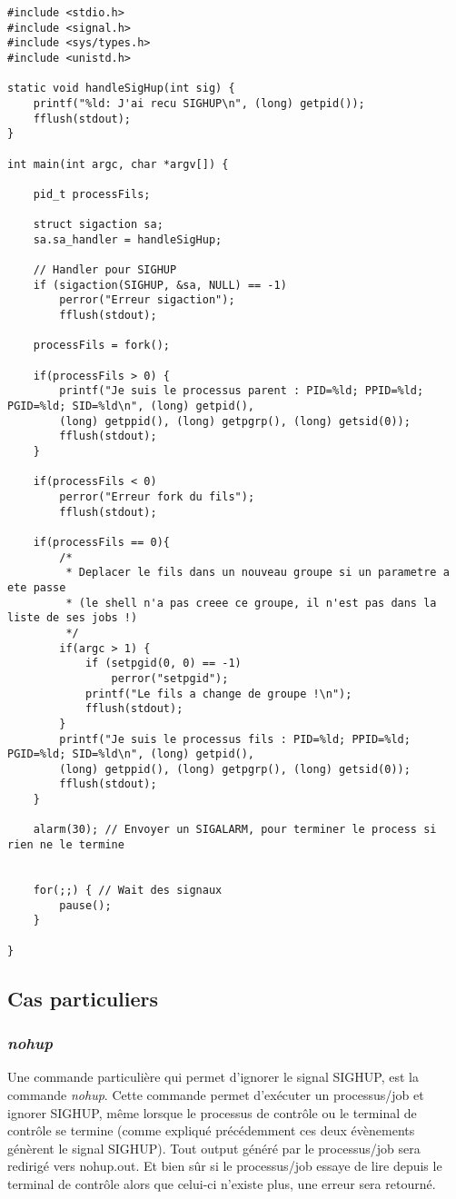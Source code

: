 \begin{lstlisting}[caption={sighup.c}, label={sighup.c}]
#include <stdio.h>
#include <signal.h>
#include <sys/types.h>
#include <unistd.h>

static void handleSigHup(int sig) {
    printf("%ld: J'ai recu SIGHUP\n", (long) getpid());
    fflush(stdout);
}

int main(int argc, char *argv[]) {

    pid_t processFils;

    struct sigaction sa;
    sa.sa_handler = handleSigHup;

    // Handler pour SIGHUP
    if (sigaction(SIGHUP, &sa, NULL) == -1)
        perror("Erreur sigaction");
        fflush(stdout);

    processFils = fork();

    if(processFils > 0) {
        printf("Je suis le processus parent : PID=%ld; PPID=%ld; PGID=%ld; SID=%ld\n", (long) getpid(),
        (long) getppid(), (long) getpgrp(), (long) getsid(0));
        fflush(stdout);
    }

    if(processFils < 0)
        perror("Erreur fork du fils");
        fflush(stdout);

    if(processFils == 0){
        /*
         * Deplacer le fils dans un nouveau groupe si un parametre a ete passe
         * (le shell n'a pas creee ce groupe, il n'est pas dans la liste de ses jobs !)
         */
        if(argc > 1) {
            if (setpgid(0, 0) == -1)
                perror("setpgid");
            printf("Le fils a change de groupe !\n");
            fflush(stdout);
        }
        printf("Je suis le processus fils : PID=%ld; PPID=%ld; PGID=%ld; SID=%ld\n", (long) getpid(),
        (long) getppid(), (long) getpgrp(), (long) getsid(0));
        fflush(stdout);
    }

    alarm(30); // Envoyer un SIGALARM, pour terminer le process si rien ne le termine


    for(;;) { // Wait des signaux
        pause();
    }

}
\end{lstlisting}

\subsection{Cas particuliers}


\subsubsection{\textit{nohup}}
Une commande particulière qui permet d’ignorer le signal SIGHUP, est la commande \textit{nohup}. Cette commande permet d’exécuter un processus/job et ignorer SIGHUP, même lorsque le processus de contrôle ou le terminal de contrôle se termine (comme expliqué précédemment ces deux évènements génèrent le signal SIGHUP). Tout output généré par le processus/job sera redirigé vers nohup.out. Et bien sûr si le processus/job essaye de lire depuis le terminal de contrôle alors que celui-ci n’existe plus, une erreur sera retourné.